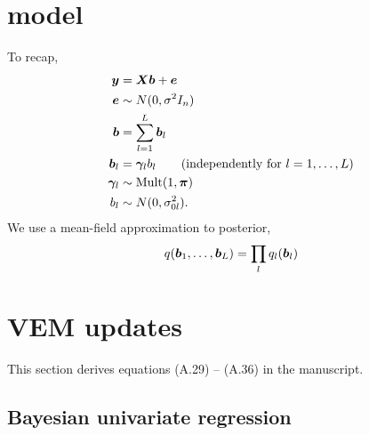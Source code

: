 \section{\susie model}

To recap,
\begin{align}
\bm y &= \bm X\bm b + \bm e \\
\bm e & \sim N(0,\sigma^2 I_n) \\ 
\bm b &= \sum_{l=1}^L \bm b_l\\
\bm b_l & = \bm \gamma_l b_l \qquad (\text{independently for } l=1,\dots,L)\\
\bm \gamma_l & \sim \text{Mult}(1,\bm \pi) \\
b_l & \sim N(0,\sigma^2_{0l}).
\end{align}
We use a mean-field approximation to posterior,
\begin{align}
q(\bm b_1, \ldots, \bm b_L) = \prod_l q_l(\bm b_l)
\end{align}

\section{\susie VEM updates}

This section derives equations (A.29) -- (A.36) in the manuscript. 

\subsection{Bayesian univariate regression} \label{sec:bur}

